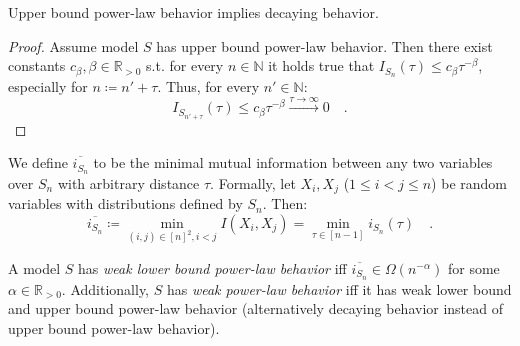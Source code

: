 \documentclass[../../main.tex]{subfiles}
\begin{document}
\pagebreak
    \begin{proposition}
        Upper bound power-law behavior implies decaying behavior.
    \end{proposition}
    \vspace{-2.5em}
    \begin{proof}
        Assume model $S$ has upper bound power-law behavior. Then there exist constants $c_\beta, \beta \in \mathbb{R}_{>0}$ s.t. for every $n \in \mathbb{N}$ it holds true that $I_{S_n}(\tau) \leq c_\beta \tau^{-\beta}$, especially for $n \coloneqq n' + \tau$. Thus, for every $n' \in \mathbb{N}$:
        \[
            I_{S_{n' + \tau}}(\tau) \leq c_\beta \tau^{-\beta} \xrightarrow{\tau \to \infty} 0 \quad .
        \]
    \end{proof}

    \begin{definition}
        We define $\overline{i_{S_n}}$ to be the minimal mutual information between any two variables over $S_n$ with arbitrary distance $\tau$. Formally, let $X_i, X_j$ ($1 \leq i < j \leq n$) be random variables with distributions defined by $S_n$. Then:
        \[
            \overline{i_{S_n}} \coloneqq \min_{(i, j) \in [n]^2, i < j} I(X_i, X_j) = \min_{\tau \in [n - 1]} i_{S_n}(\tau) \quad .
        \]
    \end{definition}

    \begin{definition}
        \label{definition:weak_power_law_behavior}
        A model $S$ has \emph{weak lower bound power-law behavior} iff $\overline{i_{S_n}} \in \Omega(n^{-\alpha})$ for some $\alpha \in \mathbb{R}_{>0}$. Additionally, $S$ has \emph{weak power-law behavior} iff it has weak lower bound and upper bound power-law behavior (alternatively decaying behavior instead of upper bound power-law behavior).
    \end{definition}
\end{document}
